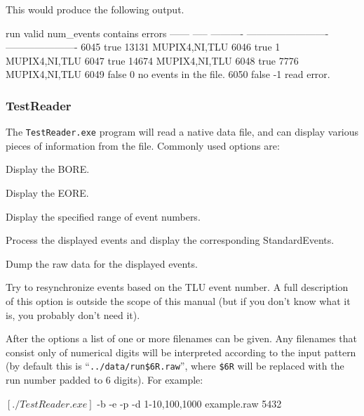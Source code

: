This would produce the following output.
\begin{listing}[]
run     valid  num_events  contains                   errors                    
------  -----  ----------  -------------------------  ----------------------
  6045   true       13131  MUPIX4,NI,TLU                                        
  6046   true           1  MUPIX4,NI,TLU                                        
  6047   true       14674  MUPIX4,NI,TLU                                        
  6048   true        7776  MUPIX4,NI,TLU                                        
  6049  false           0                             no events in the file.    
  6050  false          -1                             read error. 
\end{listing}

\subsubsection{TestReader}
\label{sec:TestReader}
The \texttt{TestReader.exe} program will read a native data file,
and can display various pieces of information from the file.
Commonly used options are:
\begin{description}
Display the \gls{BORE}.

Display the \gls{EORE}.

Display the specified range of event numbers.

Process the displayed events and display the corresponding StandardEvents.

Dump the raw data for the displayed events.

Try to resynchronize events based on the \gls{TLU} event number.
A full description of this option is outside the scope of this manual
(but if you don't know what it is, you probably don't need it).

\end{description}

After the options a list of one or more filenames can be given.
Any filenames that consist only of numerical digits
will be interpreted according to the input pattern
(by default this is ``\texttt{../data/run\$6R.raw}'',
where \texttt{\$6R} will be replaced with the run number padded to 6 digits).
For example:
\begin{listing}[mybash]
$[./TestReader.exe]$ -b -e -p -d 1-10,100,1000 example.raw 5432
\end{listing}

